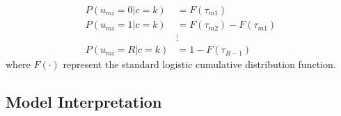 \begin{align}
    P(u_{mi}=0|c=k) &= F(\tau_{m1}) \nonumber \\
    P(u_{mi}=1|c=k) &= F(\tau_{m2}) - F(\tau_{m1}) \nonumber \\ 
    &\vdots \nonumber \\
    P(u_{mi}=R|c=k) &= 1 - F(\tau_{R-1}) 
\end{align} where $F(\cdot)$ represent the standard logistic cumulative distribution 
function.

\subsection{Model Interpretation}





